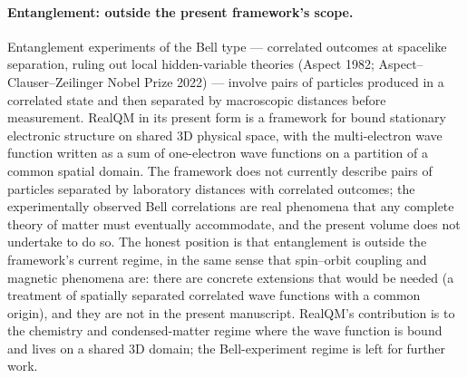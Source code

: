 \paragraph{Entanglement: outside the present framework's scope.}
Entanglement experiments of the Bell type --- correlated outcomes at spacelike separation, ruling out local hidden-variable theories (Aspect 1982; Aspect--Clauser--Zeilinger Nobel Prize 2022) --- involve pairs of particles produced in a correlated state and then separated by macroscopic distances before measurement. RealQM in its present form is a framework for bound stationary electronic structure on shared 3D physical space, with the multi-electron wave function written as a sum of one-electron wave functions on a partition of a common spatial domain. The framework does not currently describe pairs of particles separated by laboratory distances with correlated outcomes; the experimentally observed Bell correlations are real phenomena that any complete theory of matter must eventually accommodate, and the present volume does not undertake to do so. The honest position is that entanglement is outside the framework's current regime, in the same sense that spin--orbit coupling and magnetic phenomena are: there are concrete extensions that would be needed (a treatment of spatially separated correlated wave functions with a common origin), and they are not in the present manuscript. RealQM's contribution is to the chemistry and condensed-matter regime where the wave function is bound and lives on a shared 3D domain; the Bell-experiment regime is left for further work.

